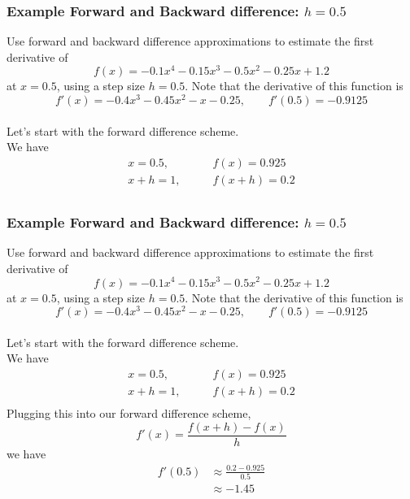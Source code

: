 \documentclass{if-beamer}
\begin{document}
\begin{frame}[t]
	\frametitle{Example Forward and Backward difference: $h= 0.5$}
	Use forward and backward difference approximations to estimate the first derivative of
	$$f(x) = -0.1x^4-0.15x^3-0.5x^2-0.25x+1.2 $$
	at $x=0.5$, using a step size $h = 0.5$. Note that the derivative of this function is
	$$f'(x) = -0.4x^3-0.45x^2-x-0.25, \qquad f'(0.5) = -0.9125$$
	\\\vspace{5pt}
	Let's start with the forward difference scheme.\\\vspace{5pt}
	We have
	\begin{align*}
		x = 0.5, \qquad &f(x) = 0.925\\
		x+h = 1, \qquad &f(x+h) = 0.2\\
	\end{align*}
\end{frame}

\begin{frame}[t]
	\frametitle{Example Forward and Backward difference: $h= 0.5$}
	Use forward and backward difference approximations to estimate the first derivative of
	$$f(x) = -0.1x^4-0.15x^3-0.5x^2-0.25x+1.2 $$
	at $x=0.5$, using a step size $h = 0.5$. Note that the derivative of this function is
	$$f'(x) = -0.4x^3-0.45x^2-x-0.25, \qquad f'(0.5) = -0.9125$$
	\\\vspace{5pt}
	Let's start with the forward difference scheme.\\\vspace{5pt}
	We have
	\begin{align*}
		x = 0.5, \qquad &f(x) = 0.925\\
		x+h = 1, \qquad &f(x+h) = 0.2\\
	\end{align*}
	Plugging this into our forward difference scheme, 
	$$f'(x) = \frac{f(x+h)-f(x)}{h} $$
	we have
	\begin{align*}
		f'(0.5) &\approx \frac{0.2-0.925}{0.5} \\
		&\approx -1.45
	\end{align*}
\end{frame}
\end{document}
